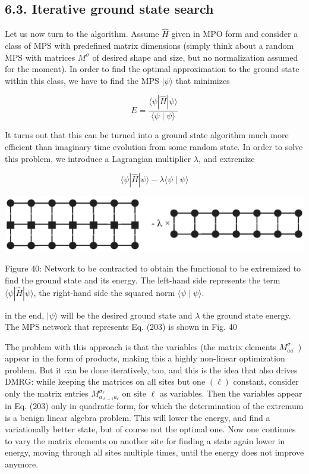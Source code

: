 \documentclass[12pt]{article}
\begin{document}
\subsection*{6.3. Iterative ground state search}
Let us now turn to the algorithm. Assume $\hat{H}$ given in MPO form and consider a class of MPS with predefined matrix dimensions (simply think about a random MPS with matrices $M^{\sigma}$ of desired shape and size, but no normalization assumed for the moment). In order to find the optimal approximation to the ground state within this class, we have to find the MPS $|\psi\rangle$ that minimizes


\begin{equation*}
E=\frac{\langle\psi|\hat{H}| \psi\rangle}{\langle\psi \mid \psi\rangle} \tag{202}
\end{equation*}


It turns out that this can be turned into a ground state algorithm much more efficient than imaginary time evolution from some random state. In order to solve this problem, we introduce a Lagrangian multiplier $\lambda$, and extremize


\begin{equation*}
\langle\psi|\hat{H}| \psi\rangle-\lambda\langle\psi \mid \psi\rangle \tag{203}
\end{equation*}


\begin{center}
\includegraphics[max width=\textwidth]{2024_05_04_afc4ad226da9ccfe0ac8g-065}
\end{center}

Figure 40: Network to be contracted to obtain the functional to be extremized to find the ground state and its energy. The left-hand side represents the term $\langle\psi|\hat{H}| \psi\rangle$, the right-hand side the squared norm $\langle\psi \mid \psi\rangle$.

in the end, $|\psi\rangle$ will be the desired ground state and $\lambda$ the ground state energy. The MPS network that represents Eq. (203) is shown in Fig. 40

The problem with this approach is that the variables (the matrix elements $M_{a a^{\prime}}^{\sigma}$ ) appear in the form of products, making this a highly non-linear optimization problem. But it can be done iteratively, too, and this is the idea that also drives DMRG: while keeping the matrices on all sites but one $(\ell)$ constant, consider only the matrix entries $M_{a_{\ell-1} a_{\ell}}^{\sigma_{\ell}}$ on site $\ell$ as variables. Then the variables appear in Eq. (203) only in quadratic form, for which the determination of the extremum is a benign linear algebra problem. This will lower the energy, and find a variationally better state, but of course not the optimal one. Now one continues to vary the matrix elements on another site for finding a state again lower in energy, moving through all sites multiple times, until the energy does not improve anymore.
\end{document}
